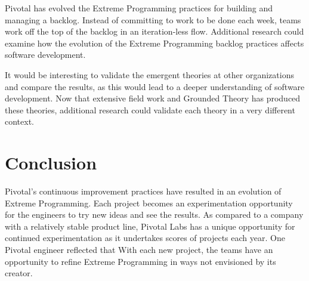 Pivotal has evolved the Extreme Programming practices for building and managing a backlog. Instead of committing to work to be done each week, teams work off the top of the backlog in an iteration-less flow. Additional research could examine how the evolution of the Extreme Programming backlog practices affects software development.

It would be interesting to validate the emergent theories at other organizations and compare the results, as this would lead to a deeper understanding of software development. Now that extensive field work and Grounded Theory has produced these theories, additional research could validate each theory in a very different context.
\section{Conclusion}
Pivotal's continuous improvement practices have resulted in an evolution of Extreme Programming.  Each project becomes an experimentation opportunity for the engineers to try new ideas and see the results. As compared to a company with a relatively stable product line, Pivotal Labs has a unique opportunity for continued experimentation as it undertakes scores of projects each year. One Pivotal engineer reflected that   With each new project, the teams have an opportunity to refine Extreme Programming in ways not envisioned by its creator. 
